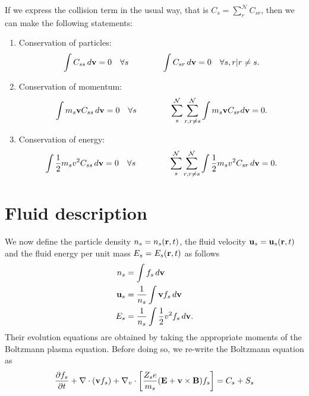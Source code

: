 \documentclass[a4paper,11pt]{report}
\begin{document}
If we express the collision term in the usual way, that is $C_s = \sum_r^\mathcal{N} C_{s r}$, then we can make the following statements:
\begin{enumerate}
\item Conservation of particles:
\begin{equation}
    \label{eq:coll_cons_particles}
    \int C_{ss} \, d\mathbf{v} = 0 \quad \forall s \qquad \qquad
    \int C_{sr} \,d\mathbf{v} = 0 \quad \forall s, r | r \ne s.
\end{equation}

\item Conservation of momentum:
\begin{equation}
    \label{eq:coll_cons_momentum}
    \int m_s \mathbf{v} C_{ss} \, d\mathbf{v} = 0 \quad \forall s \qquad \qquad \sum_s^\mathcal{N} \sum_{r, r \ne s}^\mathcal{N} \int m_s \mathbf{v} C_{sr} d\mathbf{v} = 0.
\end{equation}

\item Conservation of energy:
\begin{equation}
    \label{eq:coll_cons_energy}
    \int \frac{1}{2} m_s v^2 C_{ss} \, d\mathbf{v} = 0 \quad \forall s \qquad \qquad \sum_s^\mathcal{N} \sum_{r, r \ne s}^\mathcal{N} \int \frac{1}{2} m_s v^2 C_{sr} \, d\mathbf{v} = 0.
\end{equation}

\end{enumerate}

\section{Fluid description}
\label{sec:gov_eqs_fluid_description}

We now define the particle density $n_s = n_s(\mathbf{r},t)$, the fluid velocity $\mathbf{u}_s = \mathbf{u}_s(\mathbf{r},t)$ and the fluid energy per unit mass $E_s = E_s(\mathbf{r},t)$ as follows
\begin{align}
n_s &= \int f_s \, d\mathbf{v} \\
\mathbf{u}_s &= \frac{1}{n_s} \int \mathbf{v} f_s \, d\mathbf{v} \\
E_s &= \frac{1}{n_s} \int \frac{1}{2} v^2 f_s \, d\mathbf{v}.
\end{align}
Their evolution equations are obtained by taking the appropriate moments of the Boltzmann plasma equation. Before doing so, we re-write the Boltzmann equation as
\begin{equation}
\label{eq:boltz_mod}
\frac{\partial f_s}{\partial t} + \nabla \cdot (\mathbf{v} f_s) + \nabla_v \cdot \left [ \frac{Z_s e}{m_s} ( \mathbf{E} + \mathbf{v} \times \mathbf{B} ) f_s \right ] = C_s + S_s
\end{equation}
\end{document}
